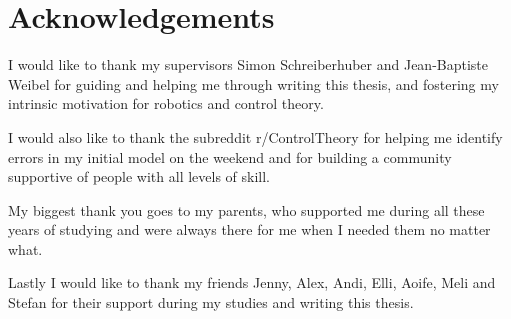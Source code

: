 \documentclass[class=report, crop=false]{standalone}
\begin{document}
\chapter{Acknowledgements}\label{cha:acknowledgements}

I would like to thank my supervisors Simon Schreiberhuber and Jean-Baptiste Weibel for guiding and helping me through writing this thesis, and fostering my intrinsic motivation for robotics and control theory.

I would also like to thank the subreddit r/ControlTheory for helping me identify errors in my initial model on the weekend and for building a community supportive of people with all levels of skill.

My biggest thank you goes to my parents, who supported me during all these years of studying and were always there for me when I needed them no matter what.

Lastly I would like to thank my friends Jenny, Alex, Andi, Elli, Aoife, Meli and Stefan for their support during my studies and writing this thesis.
\end{document}
